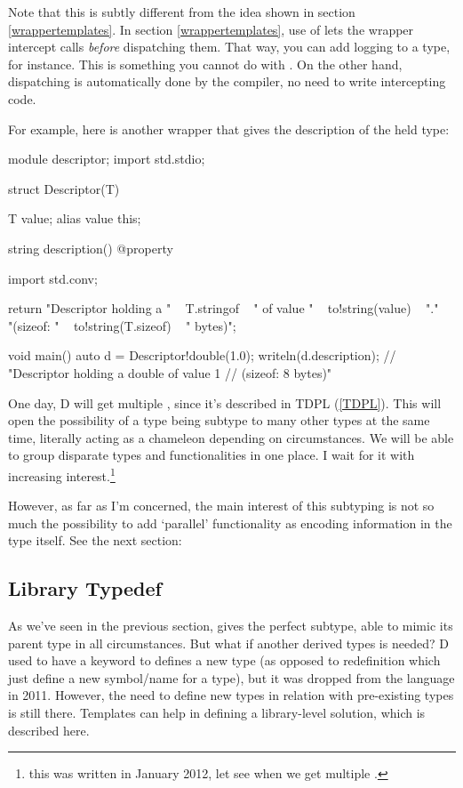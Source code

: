 Note that this is subtly different from the idea shown in section \ref{wrappertemplates}. In section \ref{wrappertemplates}, use of  lets the wrapper intercept calls \emph{before} dispatching them. That way, you can add logging to a type, for instance. This is something you cannot do with . On the other hand,  dispatching is automatically done by the compiler, no need to write intercepting code.

For example, here is another wrapper that gives the description of the held type:

\begin{dcode}
module descriptor;
import std.stdio;

struct Descriptor(T)
{
    T value;
    alias value this;
    
    string description() @property
    {
        import std.conv;
        
        return "Descriptor holding a " ~ T.stringof
             ~ " of value " ~ to!string(value) ~ ".\n"
             ~ "(sizeof: " ~ to!string(T.sizeof) ~ " bytes)";
    }
}

void main()
{
    auto d = Descriptor!double(1.0);
    writeln(d.description); // "Descriptor holding a double of value 1
                            //  (sizeof: 8 bytes)"
}
\end{dcode}

One day, D will get multiple , since it's described in TDPL (\ref{TDPL}). This will open the possibility of a type being subtype to many other types at the same time, literally acting as a chameleon depending on circumstances. We will be able to group disparate types and functionalities in one place. I wait for it with increasing interest.\footnote{this was written in January 2012, let see when we get multiple .}

However, as far as I'm concerned, the main interest of this subtyping is not so much the possibility to add `parallel' functionality as encoding information in the type itself. See the next section:

\subsection{Library Typedef}\label{typedef}

As we've seen in the previous section,  gives the perfect subtype, able to mimic its parent type in all circumstances. But what if another derived types is needed? D used to have a  keyword to defines a new type (as opposed to  redefinition which just define a new symbol/name for a type), but it was dropped from the language in 2011. However, the need to define new types in relation with pre-existing types is still there. Templates can help in defining a library-level solution, which is described here.

